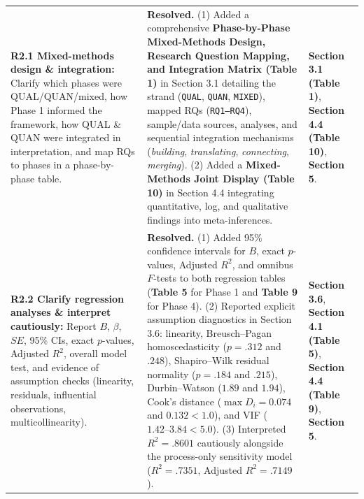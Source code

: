 \documentclass[11pt, a4paper]{article}
\begin{document}
\begin{longtable}{@{} >{\raggedright\arraybackslash}p{3.9cm} >{\raggedright\arraybackslash}p{8.8cm} >{\raggedright\arraybackslash}p{2.9cm} @{}}
\multicolumn{3}{@{}l}{\textbf{PART 2: RESPONSES TO REVIEWER 2 (ENDORSED)}} \tabularnewline
\midrule

\textbf{R2.1 Mixed-methods design \& integration:} Clarify which phases were QUAL/QUAN/mixed, how Phase 1 informed the framework, how QUAL \& QUAN were integrated in interpretation, and map RQs to phases in a phase-by-phase table. 
& 
\textbf{Resolved.} (1) Added a comprehensive \textbf{Phase-by-Phase Mixed-Methods Design, Research Question Mapping, and Integration Matrix (Table 1)} in Section 3.1 detailing the strand (\texttt{QUAL}, \texttt{QUAN}, \texttt{MIXED}), mapped RQs (\texttt{RQ1--RQ4}), sample/data sources, analyses, and sequential integration mechanisms (\textit{building}, \textit{translating}, \textit{connecting}, \textit{merging}). (2) Added a \textbf{Mixed-Methods Joint Display (Table 10)} in Section 4.4 integrating quantitative, log, and qualitative findings into meta-inferences.
& 
\textbf{Section 3.1 (Table 1)}, \newline \textbf{Section 4.4 (Table 10)}, \newline \textbf{Section 5}. \tabularnewline
\midrule

\textbf{R2.2 Clarify regression analyses \& interpret cautiously:} Report $B$, $\beta$, $SE$, 95\% CIs, exact $p$-values, Adjusted $R^2$, overall model test, and evidence of assumption checks (linearity, residuals, influential observations, multicollinearity). 
& 
\textbf{Resolved.} (1) Added 95\% confidence intervals for $B$, exact $p$-values, Adjusted $R^2$, and omnibus $F$-tests to both regression tables (\textbf{Table 5} for Phase 1 and \textbf{Table 9} for Phase 4). (2) Reported explicit assumption diagnostics in Section 3.6: linearity, Breusch--Pagan homoscedasticity ($p = .312$ and $.248$), Shapiro--Wilk residual normality ($p = .184$ and $.215$), Durbin--Watson ($1.89$ and $1.94$), Cook's distance ($\max D_i = 0.074$ and $0.132 < 1.0$), and VIF ($1.42\text{--}3.84 < 5.0$). (3) Interpreted $R^2 = .8601$ cautiously alongside the process-only sensitivity model ($R^2 = .7351$, Adjusted $R^2 = .7149$).
& 
\textbf{Section 3.6}, \newline \textbf{Section 4.1 (Table 5)}, \newline \textbf{Section 4.4 (Table 9)}, \newline \textbf{Section 5}. \tabularnewline
\bottomrule
\end{longtable}
\end{document}
